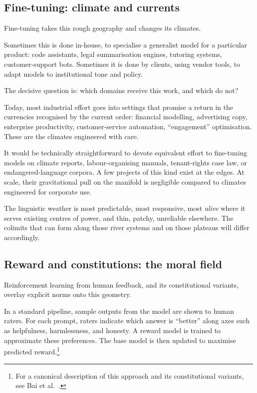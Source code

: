 \subsection{Fine-tuning: climate and currents}

Fine-tuning takes this rough geography and changes its climates.

Sometimes this is done in-house, to specialise a generalist model for a particular product: code assistants, legal summarisation engines, tutoring systems, customer-support bots. Sometimes it is done by clients, using vendor tools, to adapt models to institutional tone and policy.

The decisive question is: which domains receive this work, and which do not?

Today, most industrial effort goes into settings that promise a return in the currencies recognised by the current order: financial modelling, advertising copy, enterprise productivity, customer-service automation, ``engagement'' optimisation. These are the climates engineered with care.

It would be technically straightforward to devote equivalent effort to fine-tuning models on climate reports, labour-organising manuals, tenant-rights case law, or endangered-language corpora. A few projects of this kind exist at the edges. At scale, their gravitational pull on the manifold is negligible compared to climates engineered for corporate use.

The linguistic weather is most predictable, most responsive, most \emph{alive} where it serves existing centres of power, and thin, patchy, unreliable elsewhere. The colimits that can form along those river systems and on those plateaus will differ accordingly.

\subsection{Reward and constitutions: the moral field}

Reinforcement learning from human feedback, and its constitutional variants, overlay explicit norms onto this geometry.

In a standard pipeline, sample outputs from the model are shown to human raters. For each prompt, raters indicate which answer is ``better'' along axes such as helpfulness, harmlessness, and honesty. A reward model is trained to approximate these preferences. The base model is then updated to maximise predicted reward.\footnote{For a canonical description of this approach and its constitutional variants, see Bai et al.\ \cite{bai2022constitutional}.}

